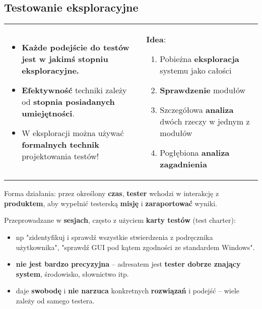 \documentclass[../main.tex]{subfiles}
\begin{document}
    \subsection{Testowanie eksploracyjne}

    \begin{table}[H]
        \begin{center}
            \begin{tabular}{p{8cm} p{8cm}}
                \begin{itemize}
                    \item \textbf{Każde podejście do testów jest w jakimś stopniu eksploracyjne.}

                    \item \textbf{Efektywność} techniki zależy od \textbf{stopnia posiadanych umiejętności}.

                    \item W eksploracji można używać \textbf{formalnych technik} projektowania testów!
                \end{itemize}
                &
                \textbf{Idea}:
                \begin{enumerate}
                    \item Pobieżna \textbf{eksploracja} systemu jako całości
                    \item \textbf{Sprawdzenie} modułów
                    \item Szczegółowa \textbf{analiza} dwóch rzeczy w jednym z modułów
                    \item Pogłębiona \textbf{analiza zagadnienia}
                \end{enumerate}
            \end{tabular}
        \end{center}
    \end{table}

    Forma działania: przez określony \textbf{czas}, \textbf{tester} wchodzi w interakcję z \textbf{produktem},
    aby wypełnić testerską \textbf{misję} i \textbf{zaraportować} wyniki.

    Przeprowadzane w \textbf{sesjach}, często z użyciem \textbf{karty testów} (test charter):
    \begin{itemize}
        \item np "zidentyfikuj i sprawdź
        wszystkie stwierdzenia z podręcznika użytkownika", "sprawdź GUI pod kątem zgodności ze standardem Windows".
        \item \textbf{nie jest bardzo precyzyjna} – adresatem jest \textbf{tester dobrze znający system}, środowisko,
        słownictwo itp.
        \item daje \textbf{swobodę} i \textbf{nie narzuca} konkretnych \textbf{rozwiązań} i podejść – wiele zależy od samego testera.
    \end{itemize}
\end{document}
